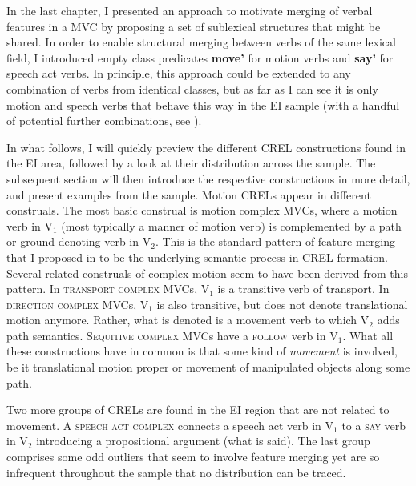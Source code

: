 In the last chapter, I presented an approach to motivate merging of verbal features in a MVC by proposing a set of sublexical structures that might be shared. In order to enable structural merging between verbs of the same lexical field, I introduced empty class predicates \textbf{move'} for motion verbs and \textbf{say'} for speech act verbs. In principle, this approach could be extended to any combination of verbs from identical classes, but as far as I can see it is only motion and speech verbs that behave this way in the EI sample (with a handful of potential further combinations, see ). 

In what follows, I will quickly preview the different CREL constructions found in the EI area, followed by a look at their distribution across the sample. The subsequent section will then introduce the respective constructions in more detail, and present examples from the sample. Motion CRELs appear in different construals. The most basic construal is motion complex MVCs, where a motion verb in V$_1$ (most typically a manner of motion verb) is complemented by a path or ground-denoting verb in V$_2$. This is the standard pattern of feature merging that I  proposed in  to be the underlying semantic process in CREL formation. Several related construals of complex motion seem to have been derived from this pattern. In \textsc{transport complex} MVCs, V$_1$ is a transitive verb of transport. In \textsc{direction complex} MVCs, V$_1$ is also transitive, but does not denote translational motion anymore. Rather, what is denoted is a movement verb to which V$_2$ adds path semantics. \textsc{Sequitive complex} MVCs have a \textsc{follow} verb in V$_1$. What all these constructions have in common is that some kind of \emph{movement} is involved, be it translational motion proper or movement of manipulated objects along some path.

\largerpage[1]
Two more groups of CRELs are found in the EI region that are not related to movement. A \textsc{speech act complex} connects a speech act verb in V$_1$ to a \textsc{say} verb in V$_2$ introducing a propositional argument (what is said). The last group comprises some odd outliers that seem to involve feature merging yet are so infrequent throughout the sample that no distribution can be traced.

